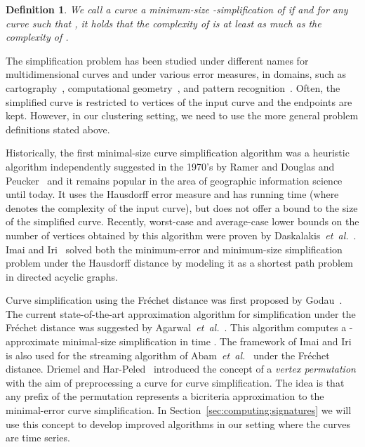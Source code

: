 \documentclass[11pt, letter]{article}
\newcommand{\etal}{\textit{e{}t~a{}l.}\xspace}
\newtheorem{definition}[theorem]{Definition}
\newcommand{\secref}[1]{Section~\ref{sec:#1}}
\newcommand{\deflab}[1]{\label{def:#1}}
\newcommand{\Frechet}{Fr\'echet\xspace}
\begin{document}
\begin{definition}\deflab{min:size:simp}
We call a curve  a minimum-size -simplification of  if  and
for any curve  such that  , it holds that the complexity of  is at least as much as the complexity of .
\end{definition}

The simplification problem has been studied under different names for
multidimensional curves and under various error measures, in domains, such as
cartography~\cite{dp-73,ramer1972iterative}, computational
geometry~\cite{godau1991natural}, and pattern recognition~\cite{pratt2002search}. 
  Often, the simplified curve is restricted to vertices of the input curve and
  the endpoints are kept. However, in our clustering setting, we need to use  
  the more general problem definitions stated above.
  
  Historically, the first minimal-size curve simplification algorithm was a
  heuristic algorithm independently suggested in the 1970's by Ramer and Douglas
  and Peucker~\cite{dp-73,ramer1972iterative} and it remains popular in the area
  of geographic information science until today.  It uses the Hausdorff error
  measure and has running time  (where  denotes the complexity of the
  input curve), but does not offer a bound to the size of the simplified curve.
  Recently, worst-case  and average-case lower bounds on the number of vertices
  obtained by this algorithm were proven by
  Daskalakis~\etal~\cite{daskalakis2010good}.  Imai and Iri~\cite{ii-pac-1988}
  solved both the minimum-error and minimum-size simplification problem under
  the Hausdorff distance by modeling it as a shortest path problem in directed
  acyclic graphs.

Curve simplification using the \Frechet distance was first proposed by
Godau~\cite{godau1991natural}.  The current state-of-the-art approximation algorithm for
simplification under the \Frechet distance was suggested by
Agarwal~\etal~\cite{ahmw-nltcs-05}. This algorithm computes a -approximate
minimal-size simplification in time .  The framework of Imai and Iri
is also used for the streaming algorithm of Abam~\etal~\cite{abh-sals-10} under
the \Frechet distance.  Driemel and Har-Peled~\cite{dh-jydfd-13} introduced the
concept of a \emph{vertex permutation} with the aim of preprocessing a curve for
curve simplification. The idea is that any prefix of the permutation represents
a bicriteria approximation to the minimal-error curve simplification. In
\secref{computing:signatures} we will use this concept to develop improved
algorithms in our setting where the curves are time series.  
\end{document}

